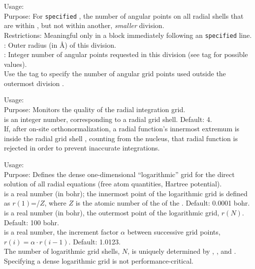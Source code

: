 {
  \noindent
  Usage:  
     \\[1.0ex]
  Purpose: For \texttt{specified}
    , the number of angular points 
    on all radial shells that are within , but not
    within another, \emph{smaller} division. \\[1.0ex]
  Restrictions: Meaningful only in a block immediately following an
     \texttt{specified}
    line. \\[1.0ex]
   : Outer radius (in {\AA}) of this division. \\
   : Integer number of angular points requested in this
    division (see  tag for
    possible values). \\
}
Use the  tag to specify the number of
angular grid points used outside the outermost division .

{
  \noindent 
  Usage:   \\[1.0ex]
  Purpose: Monitors the quality of the radial integration
    grid. \\[1.0ex]
   is an integer number, corresponding to a radial grid 
  shell. Default: 4. \\
}
If, after on-site orthonormalization, a radial function's innermost
extremum is inside the radial grid shell , counting from the
nucleus, that radial function is rejected in order to prevent
inaccurate integrations.

{
  \noindent
  Usage:  
      \\ [1.0ex]
  Purpose: Defines the dense one-dimensional ``logarithmic'' grid for
    the direct solution of all radial equations (free atom quantities,
    Hartree potential). \\[1.0ex]
   is a real number (in bohr); the innermost point 
    of the logarithmic grid is defined as $r(1)$=/$Z$,
    where $Z$ is the atomic number of the
     of the . Default:
    0.0001 bohr. \\ 
   is a real number (in bohr), the outermost point of
    the logarithmic grid, $r(N)$. Default: 100 bohr. \\
   is a real number, the increment factor $\alpha$
    between successive grid points, $r(i) = \alpha \cdot
    r(i-1)$. Default: 1.0123. \\
}
The number of logarithmic grid shells, $N$, is uniquely determined by
, , and . Specifying a
dense logarithmic grid is not performance-critical.

